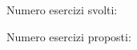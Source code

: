\documentclass[12pt]{book}
\begin{document}
%
%
%
%
%
%
%
%
%
%
%
%
%
%
%
%
%
%
%
%
%
%
%
%
%
%
%
%
%
%
%
%
%
%
%
%
%
%
%
%
%
%
%
%
%
%
%
%
%
%
%
%
%
%
%
%

%

\pagebreak

Numero esercizi svolti: \thenumex

Numero esercizi proposti: \thenumexp

\printindex

\end{document}
